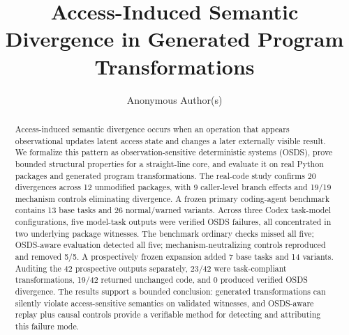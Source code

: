 \documentclass{article}
\title{Access-Induced Semantic Divergence in Generated Program Transformations}
\author{Anonymous Author(s)}
\newcommand{\osds}{OSDS}
\begin{document}
\maketitle

\begin{abstract}
Access-induced semantic divergence occurs when an operation that appears observational updates latent access state and changes a later externally visible result. We formalize this pattern as observation-sensitive deterministic systems (\osds), prove bounded structural properties for a straight-line core, and evaluate it on real Python packages and generated program transformations. The real-code study confirms 20 divergences across 12 unmodified packages, with 9 caller-level branch effects and 19/19 mechanism controls eliminating divergence. A frozen primary coding-agent benchmark contains 13 base tasks and 26 normal/warned variants. Across three Codex task-model configurations, five model-task outputs were verified OSDS failures, all concentrated in two underlying package witnesses. The benchmark ordinary checks missed all five; OSDS-aware evaluation detected all five; mechanism-neutralizing controls reproduced and removed 5/5. A prospectively frozen expansion added 7 base tasks and 14 variants. Auditing the 42 prospective outputs separately, 23/42 were task-compliant transformations, 19/42 returned unchanged code, and 0 produced verified OSDS divergence. The results support a bounded conclusion: generated transformations can silently violate access-sensitive semantics on validated witnesses, and OSDS-aware replay plus causal controls provide a verifiable method for detecting and attributing this failure mode.
\end{abstract}












{\small


}

\appendix



\end{document}
